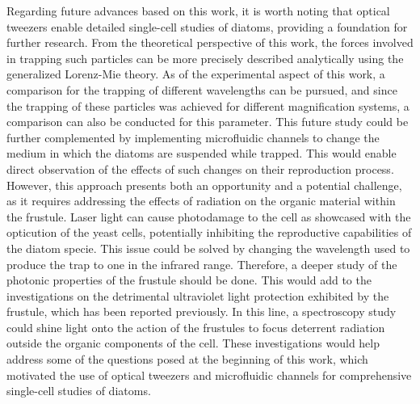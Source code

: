 \documentclass[letterpaper,12pt,oneside]{book}
\begin{document}
Regarding future advances based on this work, it is worth noting that optical tweezers enable detailed single-cell studies of diatoms, providing a foundation for further research. From the theoretical perspective of this work, the forces involved in trapping such particles can be more precisely described analytically using the generalized Lorenz-Mie theory. %
As of the experimental aspect of this work, a comparison for the trapping of different wavelengths can be pursued, and since the trapping of these particles was achieved for different magnification systems, a comparison can also be conducted for this parameter. This future study could be further complemented by implementing microfluidic channels to change the medium in which the diatoms are suspended while trapped. This would enable direct observation of the effects of such changes on their reproduction process. However, this approach presents both an opportunity and a potential challenge, as it requires addressing the effects of radiation on the organic material within the frustule. Laser light can cause photodamage to the cell as showcased with the opticution of the yeast cells, potentially inhibiting the reproductive capabilities of the diatom specie. This issue could be solved by changing the wavelength used to produce the trap to one in the infrared range. Therefore, a deeper study of the photonic properties of the frustule should be done. This would add to the investigations on the detrimental ultraviolet light protection exhibited by the frustule, which has been reported previously. In this line, a spectroscopy study could shine light onto the action of the frustules to focus deterrent radiation outside the organic components of the cell. These investigations would help address some of the questions posed at the beginning of this work, which motivated the use of optical tweezers and microfluidic channels for comprehensive single-cell studies of diatoms.

\end{document}
